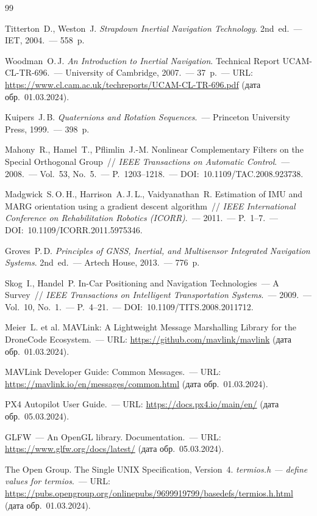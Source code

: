 \begin{thebibliography}{99}
 
    Titterton~D., Weston~J.
    \textit{Strapdown Inertial Navigation Technology}.
    2nd~ed.~--- IET, 2004.~--- 558~p.
 
    Woodman~O.\,J.
    \textit{An Introduction to Inertial Navigation}.
    Technical Report UCAM-CL-TR-696.~---
    University of Cambridge, 2007.~--- 37~p.~---
    URL: \url{https://www.cl.cam.ac.uk/techreports/UCAM-CL-TR-696.pdf}
    (дата обр.~01.03.2024).
 
    Kuipers~J.\,B.
    \textit{Quaternions and Rotation Sequences}.~---
    Princeton University Press, 1999.~--- 398~p.
 
    Mahony~R., Hamel~T., Pflimlin~J.-M.
    Nonlinear Complementary Filters on the Special Orthogonal Group~//
    \textit{IEEE Transactions on Automatic Control}.~---
    2008.~--- Vol.~53, No.~5.~--- P.~1203--1218.~---
    DOI:~10.1109/TAC.2008.923738.
 
    Madgwick~S.\,O.\,H., Harrison~A.\,J.\,L., Vaidyanathan~R.
    Estimation of IMU and MARG orientation using a gradient descent
    algorithm~//
    \textit{IEEE International Conference on Rehabilitation Robotics
    (ICORR)}.~--- 2011.~--- P.~1--7.~---
    DOI:~10.1109/ICORR.2011.5975346.
 
    Groves~P.\,D.
    \textit{Principles of GNSS, Inertial, and Multisensor Integrated
    Navigation Systems}.
    2nd~ed.~--- Artech House, 2013.~--- 776~p.
 
    Skog~I., Handel~P.
    In-Car Positioning and Navigation Technologies~--- A Survey~//
    \textit{IEEE Transactions on Intelligent Transportation Systems}.~---
    2009.~--- Vol.~10, No.~1.~--- P.~4--21.~---
    DOI:~10.1109/TITS.2008.2011712.
 
    Meier~L. et al.
    MAVLink: A Lightweight Message Marshalling Library for the
    DroneCode Ecosystem.~---
    URL: \url{https://github.com/mavlink/mavlink}
    (дата обр.~01.03.2024).
 
    MAVLink Developer Guide: Common Messages.~---
    URL: \url{https://mavlink.io/en/messages/common.html}
    (дата обр.~01.03.2024).
 
    PX4 Autopilot User Guide.~---
    URL: \url{https://docs.px4.io/main/en/}
    (дата обр.~05.03.2024).
 
    GLFW~--- An OpenGL library. Documentation.~---
    URL: \url{https://www.glfw.org/docs/latest/}
    (дата обр.~05.03.2024).
 
    The Open Group. The Single UNIX Specification, Version~4.
    \textit{termios.h --- define values for termios}.~---
    URL: \url{https://pubs.opengroup.org/onlinepubs/9699919799/basedefs/termios.h.html}
    (дата обр.~01.03.2024).
 
\end{thebibliography}
 

